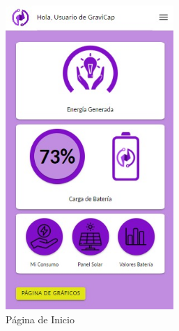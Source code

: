                     \begin{figure} [H]
                        \centering
                        \begin{subfigure}{0.4\textwidth}
                            \centering
                            \includegraphics[width=0.7\textwidth]{Imagenes/Aplicación/Start.jpg}
                            \caption{Página de Inicio}
                            \label{fig:a2.1}
                        \end{subfigure}
                        \begin{subfigure}{0.4\textwidth}
                            \centering

\end{subfigure}
\end{figure}
